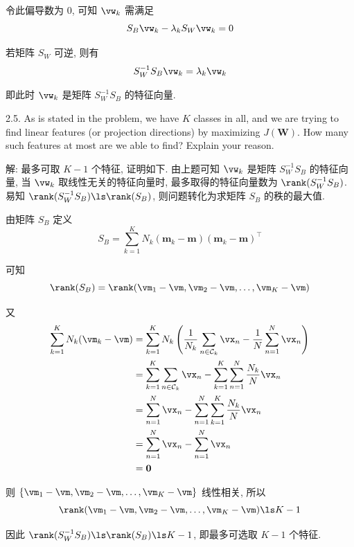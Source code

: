 \documentclass[openany]{ctexbook}
\theoremstyle{kaiti}
\theoremstyle{normal}
\begin{document}
令此偏导数为 0, 可知 $\vw_k$ 需满足
\begin{equation}
  S_B\vw_k-\lambda_kS_W\vw_k=0
\end{equation}

若矩阵 $S_W$ 可逆, 则有
\begin{equation}
  S_W^{-1}S_B\vw_k=\lambda_k\vw_k
\end{equation}

即此时 $\vw_k$ 是矩阵 $S_W^{-1}S_B$ 的特征向量.

2.5. As is stated in the problem, we have $K$ classes in all, and we are trying to find linear features (or projection directions) by maximizing $J(\bm{W})$. How many such features at most are we able to find? Explain your reason.

解: 最多可取 $K-1$ 个特征, 证明如下. 由上题可知 $\vw_k$ 是矩阵 $S_W^{-1}S_B$ 的特征向量, 当 $\vw_k$ 取线性无关的特征向量时, 最多取得的特征向量数为 $\rank(S_W^{-1}S_B)$. 易知 $\rank(S_W^{-1}S_B)\ls\rank(S_B)$, 则问题转化为求矩阵 $S_B$ 的秩的最大值.

由矩阵 $S_B$ 定义
\begin{equation}
  S_B=\sum_{k=1}^{K}N_{k}(\bm{m}_{k}-\bm{m})(\bm{m}_{k}-\bm{m})^{\top}
\end{equation}

可知
\begin{equation}
  \rank(S_B)=\rank(\vm_1-\vm,\vm_2-\vm,\dots,\vm_K-\vm)
\end{equation}

又
\begin{equation}
  \begin{aligned}
    \sum_{k=1}^KN_k(\vm_k-\vm)
    &=\sum_{k=1}^KN_k\left(\frac{1}{N_k}\sum_{n\in\mathcal{C}_k}\vx_n-\frac{1}{N}\sum_{n=1}^N\vx_n\right)\\
    &=\sum_{k=1}^K\sum_{n\in\mathcal{C}_k}\vx_n-\sum_{k=1}^K\sum_{n=1}^N\frac{N_k}{N}\vx_n\\
    &=\sum_{n=1}^N\vx_n-\sum_{n=1}^N\sum_{k=1}^K\frac{N_k}{N}\vx_n\\
    &=\sum_{n=1}^N\vx_n-\sum_{n=1}^N\vx_n\\
    &=\bm{0}
  \end{aligned}
\end{equation}

则 $\{\vm_1-\vm,\vm_2-\vm,\dots,\vm_K-\vm\}$ 线性相关, 所以
\begin{equation}
  \rank(\vm_1-\vm,\vm_2-\vm,\dots,\vm_K-\vm)\ls K-1
\end{equation}

因此 $\rank(S_W^{-1}S_B)\ls\rank(S_B)\ls K-1$, 即最多可选取 $K-1$ 个特征.
\end{document}
